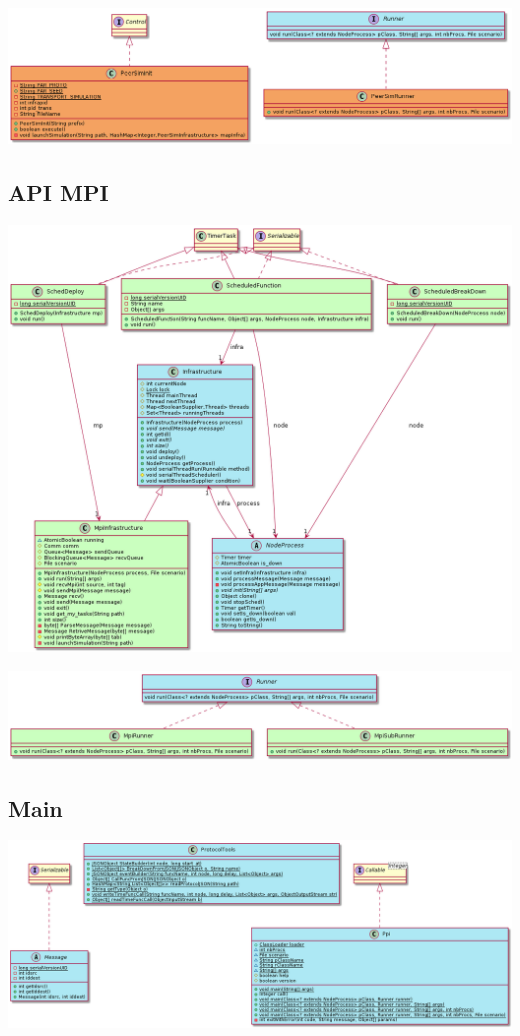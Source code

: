 \documentclass{article}
\begin{document}
			\vspace{20mm}
			\hspace*{-2.2cm} \includegraphics[width=20cm]{uml/uml_peersim_2.png}

			\newpage
			\subsection*{API MPI}
			\hspace*{-2.2cm} \includegraphics[width=20cm]{uml/uml_mpi_1.png}

			\vspace{5mm}
			\hspace*{-2.2cm} \includegraphics[width=20cm]{uml/uml_mpi_2.png}

			\newpage
			\subsection*{Main}
			\vspace{3mm}
			\hspace*{-2.3cm} \includegraphics[width=20cm]{uml/uml_main.png}
\end{document}
